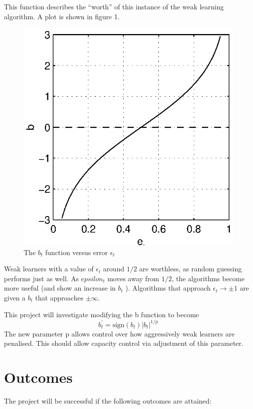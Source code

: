 	This function describes the ``worth'' of this instance of the weak
learning algorithm.  A plot is shown in figure 1.

\begin{figure}
\begin{center}
\includegraphics{figures/bfunc.eps}
\end{center}
\caption{The $b_t$ function versus error $\epsilon_t$}
\end{figure}
 
Weak learners with a value of $\epsilon_t$ around $1/2$ are worthless,
as random guessing performs just as well.  As $epsilon_t$ moves away
from $1/2$, the algorithms become more useful (and show an increase in
$b_t$ ).  Algorithms that approach $\epsilon_t \rightarrow \pm 1$ are
given a $b_t$  that approaches $\pm \infty$.

This project will investigate modifying the b function to become
\begin{equation}
b^{\prime}_t = \mathrm{sign}(b_t) |b_t|^{1/p}
\end{equation}
The new parameter p allows control over how aggressively weak learners
are penalised.  This should allow capacity control via adjustment of
this parameter.

\section{Outcomes}
The project will be successful if the following outcomes are attained:


